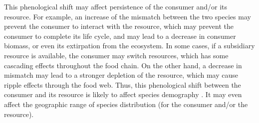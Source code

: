 \documentclass[12 pt]{article}
\begin{document}
This phenological shift may affect persistence of the consumer and/or its resource. For example, an increase of the mismatch between the two species may prevent the consumer to interact with the resource, which may prevent the consumer to complete its life cycle, and may lead to a decrease in consumer biomass, or even its extirpation from the ecosystem. In some cases, if a subsidiary resource is available, the consumer may switch resources, which has some cascading effects throughout the food chain. On the other hand, a decrease in mismatch may lead to a stronger depletion of the resource, which may cause ripple effects through the food web. Thus, this phenological shift between the consumer and its resource is likely to affect species demography \citep{MillerRushing2010}. It may even affect the geographic range of species distribution (for the consumer and/or the resource).\par
\end{document}
